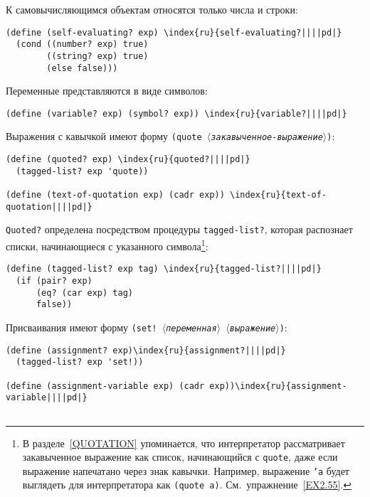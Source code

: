 \begin{plainlist}
\item
К самовычисляющимся объектам относятся только числа
и строки:

\begin{Verbatim}[fontsize=\small]
(define (self-evaluating? exp) \index{ru}{self-evaluating?||||pd|}
  (cond ((number? exp) true)
        ((string? exp) true)
        (else false)))
\end{Verbatim}

\item
Переменные представляются в виде символов:

\begin{Verbatim}[fontsize=\small]
(define (variable? exp) (symbol? exp)) \index{ru}{variable?||||pd|}
\end{Verbatim}

\item
Выражения с кавычкой имеют форму {\tt (quote
\textit{$\langle$закавыченное-вы\-ра\-же\-ние$\rangle$})}:

\begin{Verbatim}[fontsize=\small]
(define (quoted? exp) \index{ru}{quoted?||||pd|}
  (tagged-list? exp 'quote))

(define (text-of-quotation exp) (cadr exp)) \index{ru}{text-of-quotation||||pd|}
\end{Verbatim}
{\tt Quoted?} определена посредством процедуры
{\tt tagged-list?}, которая распознает списки, начинающиеся с
указанного символа\footnote{В разделе~\ref{QUOTATION} упоминается,
что интерпретатор рассматривает закавыченное 
выражение как список, начинающийся с {\tt quote}, даже если
выражение напечатано через знак кавычки.  Например, выражение
{\tt 'a} будет выглядеть для интерпретатора как {\tt (quote
a)}.  См.~упражнение~\ref{EX2.55}.}:

\begin{Verbatim}[fontsize=\small]
(define (tagged-list? exp tag) \index{ru}{tagged-list?||||pd|}
  (if (pair? exp)
      (eq? (car exp) tag)
      false))
\end{Verbatim}

\item
Присваивания имеют форму 
{\tt (set! \textit{$\langle$переменная$\rangle$} \textit{$\langle$выражение$\rangle$})}:

\begin{Verbatim}[fontsize=\small]
(define (assignment? exp)\index{ru}{assignment?||||pd|}
  (tagged-list? exp 'set!))

(define (assignment-variable exp) (cadr exp))\index{ru}{assignment-variable||||pd|}


\end{Verbatim}
\end{plainlist}

